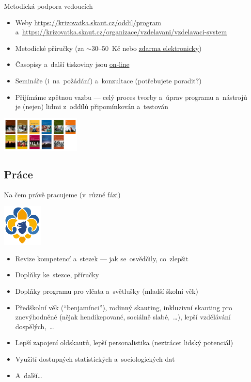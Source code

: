 \documentclass[compress, ucs, xelatex, 11pt, xcolor=dvipsnames, print,
	hyperref={
		bookmarks=true,
		unicode=true,
		colorlinks=true,
		pdftitle={Skautska vychovna metoda},
		plainpages=false,
		pdfauthor={Vojtech Zeisek},
		pdfsubject={Skautska vychovna metoda a jeji vyvoj za posledni stoleti a desetileti},
		pdfcreator={XeLaTeX},
		pdfkeywords={Junak, Pedagogika, Skaut, Skauting, Vychovna metoda},
		linkcolor=Black,
		anchorcolor=Black,
		citecolor=OliveGreen,
		filecolor=OliveGreen,
		menucolor=Black,
		urlcolor=OliveGreen,
		pdftex},
	url={hyphens, lowtilde} %
	]{beamer}
\begin{document}
\begin{frame}{Metodická podpora vedoucích}
	\begin{itemize}
		\item Weby \url{https://krizovatka.skaut.cz/oddil/program} a~\url{https://krizovatka.skaut.cz/organizace/vzdelavani/vzdelavaci-system}
		\item Metodické příručky (za $\sim$30--50~Kč nebo \href{https://www.obchod.skaut.cz/index.php?tpl=&_artperpage=99&cl=alist&searchparam=&cnid=701}{zdarma elektronicky})
		\item Časopisy a~další tiskoviny jsou \href{https://casopisy.skaut.cz/}{on-line}
		\item Semináře (i~na~požádání) a~konzultace (potřebujete poradit?)
		\item Přijímáme zpětnou vazbu --- celý proces tvorby a~úprav programu a~nástrojů je (nejen) lidmi z~oddílů připomínkován a~testován
	\end{itemize}
	\begin{center}
		\includegraphics[width=4cm]{prirucky.png}
	\end{center}
\end{frame}

\subsection{Práce}

\begin{frame}{Na čem právě pracujeme (v~různé fázi)}
	\begin{center}
		\includegraphics[width=2cm]{lilie.png}
	\end{center}
	\begin{itemize}
		\item Revize kompetencí a~stezek --- jak se~osvědčily, co~zlepšit
		\item Doplňky ke~stezce, příručky
		\item Doplňky programu pro vlčata a~světlušky (mladší školní věk)
		\item Předškolní věk (\enquote{benjamínci}), rodinný skauting, inkluzivní skauting pro znevýhodněné (nějak hendikepované, sociálně slabé,~\ldots), lepší vzdělávání dospělých,~\ldots
		\item Lepší zapojení oldskautů, lepší personalistika (neztrácet lidský potenciál)
		\item Využití dostupných statistických a~sociologických dat
		\item A~další\ldots
	\end{itemize}
\end{frame}
\end{document}
